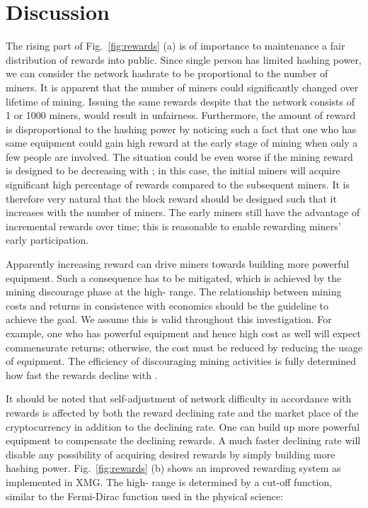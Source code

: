 \documentclass[aps,prl,reprint,showpacs,groupedaddress,letterpaper]{revtex4-1}
\begin{document}
\section{Discussion}

The rising part of Fig.~\ref{fig:rewards} (a) is of importance to maintenance a fair distribution of rewards into public. Since single person has limited hashing power, we can consider the network hashrate to be proportional to the number of miners. It is apparent that the number of miners could significantly changed over lifetime of mining. Issuing the same rewards despite that the network consists of 1 or 1000 miners, would result in unfairness. Furthermore, the amount of reward is disproportional to the hashing power by noticing such a fact that one who has same equipment could gain high reward at the early stage of mining when only a few people are involved. The situation could be even worse if the mining reward is designed to be decreasing with ; in this case, the initial miners will acquire significant high percentage of rewards compared to the subsequent miners. It is therefore very natural that the block reward should be designed such that it increases with the number of miners. The early miners still have the advantage of incremental rewards over time; this is reasonable to enable rewarding miners' early participation. 

Apparently increasing reward can drive miners towards building more powerful equipment. Such a consequence has to be mitigated, which is achieved by the mining discourage phase at the high- range. The relationship between mining costs and returns in consistence with economics should be the guideline to achieve the goal. We assume this is valid throughout this investigation. For example, one who has powerful equipment and hence high cost as well will expect commensurate returns; otherwise, the cost must be reduced by reducing the usage of equipment. The efficiency of discouraging mining activities is fully determined how fast the rewards decline with . 

It should be noted that self-adjustment of network difficulty in accordance with rewards is affected by both the reward declining rate and the market place of the cryptocurrency in addition to the declining rate. One can build up more powerful equipment to compensate the declining rewards. A much faster declining rate will disable any possibility of acquiring desired rewards by simply building more hashing power. Fig.~\ref{fig:rewards} (b) shows an improved rewarding system as implemented in XMG. The high- range is determined by a cut-off function, similar to the Fermi-Dirac function used in the physical science:
\end{document}
